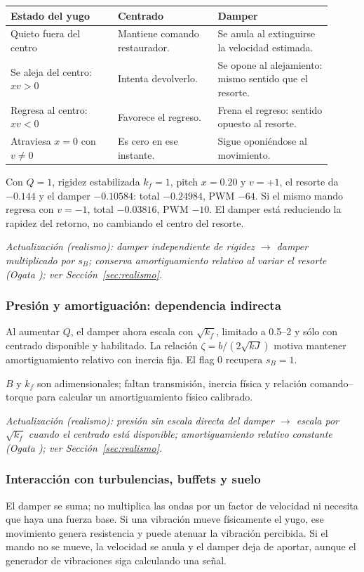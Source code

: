 \begin{longtable}{p{0.30\linewidth}p{0.29\linewidth}p{0.32\linewidth}}
\toprule
Estado del yugo & Centrado & Damper\\
\midrule
Quieto fuera del centro & Mantiene comando restaurador. & Se anula al extinguirse la velocidad estimada.\\
Se aleja del centro: $xv>0$ & Intenta devolverlo. & Se opone al alejamiento: mismo sentido que el resorte.\\
Regresa al centro: $xv<0$ & Favorece el regreso. & Frena el regreso: sentido opuesto al resorte.\\
Atraviesa $x=0$ con $v\ne0$ & Es cero en ese instante. & Sigue oponiéndose al movimiento.\\
\bottomrule
\end{longtable}
Con $Q=1$, rigidez estabilizada $k_f=1$, pitch $x=0.20$ y $v=+1$, el resorte da $-0.144$ y el damper $-0.10584$: total $-0.24984$, PWM $-64$. Si el mismo mando regresa con $v=-1$, total $-0.03816$, PWM $-10$. El damper está reduciendo la rapidez del retorno, no cambiando el centro del resorte.

\textit{Actualización (realismo): damper independiente de rigidez $\rightarrow$ damper multiplicado por $s_B$; conserva amortiguamiento relativo al variar el resorte (Ogata \cite{ogata}); ver Sección~\ref{sec:realismo}.}

\subsubsection{Presión y amortiguación: dependencia indirecta}
Al aumentar $Q$, el damper ahora escala con $\sqrt{k_f}$, limitado a 0.5--2 y sólo con centrado disponible y habilitado. La relación $\zeta=b/(2\sqrt{kJ})$ motiva mantener amortiguamiento relativo con inercia fija. El flag 0 recupera $s_B=1$.

$B$ y $k_f$ son adimensionales; faltan transmisión, inercia física y relación comando--torque para calcular un amortiguamiento físico calibrado.

\textit{Actualización (realismo): presión sin escala directa del damper $\rightarrow$ escala por $\sqrt{k_f}$ cuando el centrado está disponible; amortiguamiento relativo constante (Ogata \cite{ogata}); ver Sección~\ref{sec:realismo}.}

\subsubsection{Interacción con turbulencias, buffets y suelo}
El damper se suma; no multiplica las ondas por un factor de velocidad ni necesita que haya una fuerza base. Si una vibración mueve físicamente el yugo, ese movimiento genera resistencia y puede atenuar la vibración percibida. Si el mando no se mueve, la velocidad se anula y el damper deja de aportar, aunque el generador de vibraciones siga calculando una señal.

